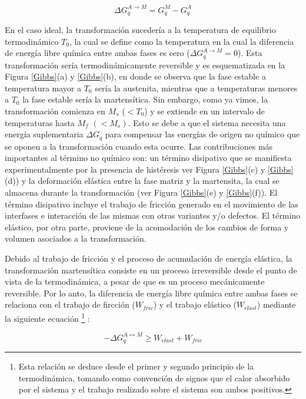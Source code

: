 \documentclass[12pt]{article}
\theoremstyle{definition}
\theoremstyle{remark}
\begin{document}
\begin{equation}
\Delta G^{A \rightarrow M}_q = G^M_q - G^A_q
\end{equation} 

En el caso ideal, la transformación sucedería a la temperatura de equilibrio termodinámico $T_0$, la cual se define como la temperatura en la cual la diferencia de energía libre química entre ambas fases es cero ($\Delta G^{A \rightarrow M}_q = 0$). Esta transformación sería termodinámicamente reversible y es esquematizada en la Figura \ref{Gibbs}(a) y \ref{Gibbs}(b), en donde se observa que la fase estable a temperatura mayor a $T_0$ sería la austenita, mientras que a temperaturas menores a $T_0$ la fase estable sería la martensítica. Sin embargo, como ya vimos, la transformación comienza en $M_s$  ($< T_0$) y se extiende en un intervalo de temperaturas hasta $M_f$  $(< M_s)$. Esto se debe a que el sistema necesita una energía suplementaria $\Delta G_q$ para compensar las energías de origen no químico que se oponen a la transformación cuando esta ocurre. Las contribuciones más importantes al término no químico son: un término disipativo que se manifiesta experimentalmente por la presencia de histéresis ver Figura \ref{Gibbs}(c) y \ref{Gibbs}(d)) y la deformación elástica entre la fase matriz y la martensita, la cual se almacena durante la transformación (ver Figura \ref{Gibbs}(e) y \ref{Gibbs}(f)). El término disipativo incluye el trabajo de fricción generado en el movimiento de las interfases e interacción de las mismas con otras variantes y/o defectos. El término elástico, por otra parte, proviene de la acomodación de los cambios de forma y volumen asociados a la transformación\cite{Wollants1993}.

Debido al trabajo de fricción y el proceso de acumulación de energía elástica, la transformación martensítica consiste en un proceso irreversible desde el punto de vista de la termodinámica, a pesar de que es un proceso mecánicamente reversible. Por lo anto, la diferencia de energía libre química entre ambas fases se relaciona con el trabajo de fircción ($W_{fric}$) y el trabajo elástico ($W_{elast}$) mediante la siguiente ecuación \footnote{Esta relación se deduce desde el primer y segundo principio de la termodinámica, tomando como convención de signos que el calor absorbido por el sistema y el trabajo realizado sobre el sistema son ambos positivos.} \cite{Isola2020}:

\begin{equation}
	- \Delta G_{q}^{A \leftrightarrow M} \geq W_{elast} + W_{fric}
\end{equation}
\end{document}
